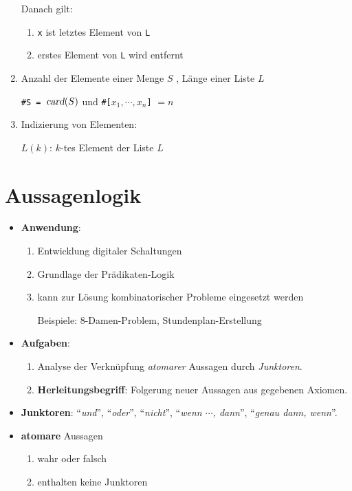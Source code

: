 \documentclass{article}
\begin{document}
\begin{enumerate}
      Danach gilt:
      \begin{enumerate}
      \item \texttt{x} ist letztes Element von \texttt{L}
      \item erstes Element von \texttt{L} wird entfernt
      \end{enumerate}
\item Anzahl der Elemente einer Menge $S$ , L\"{a}nge einer Liste $L$

      \texttt{\#S = $\textsl{card}(S)$} \quad und \quad
      \texttt{\#[}$x_1,\cdots,x_n$\texttt{]} $ = n$
\item Indizierung von Elementen: 

      $L(k)$: \quad $k$-tes Element der Liste $L$
\end{enumerate}

\section{Aussagenlogik}    
\begin{itemize}
\item \textbf{Anwendung}:
  \begin{enumerate}
  \item Entwicklung digitaler Schaltungen
  \item Grundlage der Pr\"{a}dikaten-Logik
  \item kann zur L\"{o}sung kombinatorischer Probleme eingesetzt werden

        Beispiele: 8-Damen-Problem, Stundenplan-Erstellung
  \end{enumerate}
\item \textbf{Aufgaben}: 
  \begin{enumerate}
  \item Analyse der Verkn\"{u}pfung \emph{atomarer} Aussagen durch \emph{Junktoren}.  
  \item \textbf{Herleitungsbegriff}:
        Folgerung neuer Aussagen aus gegebenen Axiomen.
  \end{enumerate}
\item \textbf{Junktoren}:  ``\emph{und}'', ``\emph{oder}'', ``\emph{nicht}'', ``\emph{wenn $\cdots$, dann}'',
        ``\emph{genau dann, wenn}''.
\item \textbf{atomare} Aussagen
      \begin{enumerate}
      \item wahr oder falsch 
      \item enthalten keine Junktoren 
      \end{enumerate}
\end{itemize}
\end{document}
